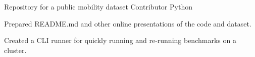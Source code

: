 \begin{cventries}
  \cventry
    {Repository for a public mobility dataset}
    {}
    {Contributor}
    {Python} 
    {
      \begin{cvitems} %
        \item {Prepared README.md and other online presentations of the code and dataset.}
        \item {Created a CLI runner for quickly running and re-running benchmarks on a cluster.}
      \end{cvitems}
    }



\end{cventries}
    




